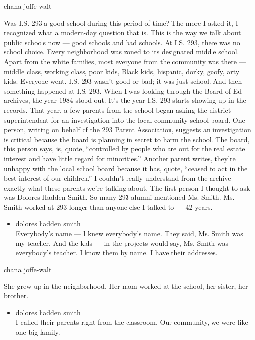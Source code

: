 chana joffe-walt

Was I.S. 293 a good school during this period of time? The more I asked
it, I recognized what a modern-day question that is. This is the way we
talk about public schools now --- good schools and bad schools. At I.S.
293, there was no school choice. Every neighborhood was zoned to its
designated middle school. Apart from the white families, most everyone
from the community was there --- middle class, working class, poor kids,
Black kids, hispanic, dorky, goofy, arty kids. Everyone went. I.S. 293
wasn't good or bad; it was just school. And then something happened at
I.S. 293. When I was looking through the Board of Ed archives, the year
1984 stood out. It's the year I.S. 293 starts showing up in the records.
That year, a few parents from the school began asking the district
superintendent for an investigation into the local community school
board. One person, writing on behalf of the 293 Parent Association,
suggests an investigation is critical because the board is planning in
secret to harm the school. The board, this person says, is, quote,
``controlled by people who are out for the real estate interest and have
little regard for minorities.'' Another parent writes, they're unhappy
with the local school board because it has, quote, ``ceased to act in
the best interest of our children.'' I couldn't really understand from
the archive exactly what these parents we're talking about. The first
person I thought to ask was Dolores Hadden Smith. So many 293 alumni
mentioned Ms. Smith. Ms. Smith worked at 293 longer than anyone else I
talked to --- 42 years.

\begin{itemize}
\tightlist
\item
  dolores hadden smith\\
  Everybody's name --- I knew everybody's name. They said, Ms. Smith was
  my teacher. And the kids --- in the projects would say, Ms. Smith was
  everybody's teacher. I know them by name. I have their addresses.
\end{itemize}

chana joffe-walt

She grew up in the neighborhood. Her mom worked at the school, her
sister, her brother.

\begin{itemize}
\tightlist
\item
  dolores hadden smith\\
  I called their parents right from the classroom. Our community, we
  were like one big family.
\end{itemize}

